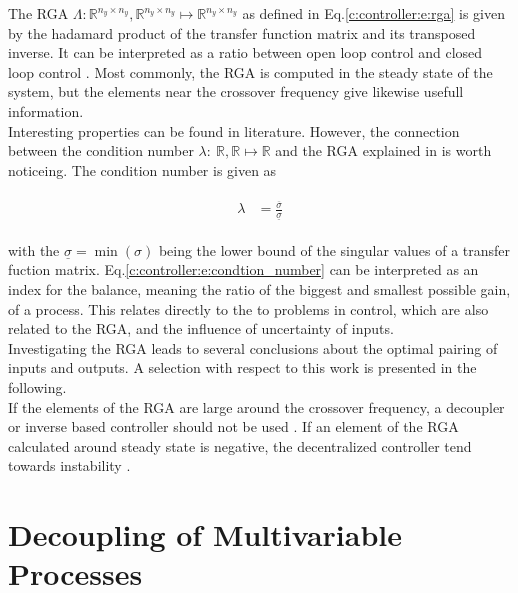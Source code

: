 The RGA $\Lambda:\mathbb{R}^{n_y \times n_y},\mathbb{R}^{n_y \times n_y} \mapsto \mathbb{R}^{n_y \times n_y}$ as defined in Eq.\ref{c:controller:e:rga} is given by the hadamard product of the transfer function matrix and its transposed inverse. It can be interpreted as a ratio between open loop control and closed loop control \cite[p.221]{Glad2000}. Most commonly, the RGA is computed in the steady state of the system, but the elements near the crossover frequency give likewise usefull information.\\

Interesting properties can be found in literature. However, the connection between the condition number $\lambda:~\mathbb{R},\mathbb{R} \mapsto \mathbb{R}$ and the RGA explained in \cite[p.88 f.]{Skogestad2005} is worth noticeing. The condition number is given as

\begin{align}
\begin{split}
\lambda &= \frac{\overline{\sigma}}{\underline{\sigma}}
\end{split}
\label{c:controller:e:condtion_number}
\end{align}

with the $\underline{\sigma} = \min(\sigma)$ being the lower bound of the singular values of a transfer fuction matrix. Eq.\ref{c:controller:e:condtion_number} can be interpreted as an index for the balance, meaning the ratio of the biggest and smallest possible gain, of a process. This relates directly to the to problems in control, which are also related to the RGA, and the influence of uncertainty of inputs.\\

Investigating the RGA leads to several conclusions about the optimal pairing of inputs and outputs. A selection with respect to this work is presented in the following.\\

If the elements of the RGA are large around the crossover frequency, a decoupler or inverse based controller should not be used \cite[p. 89]{Skogestad2005}. If an element of the RGA calculated around steady state is negative, the decentralized controller tend towards instability \cite[p.90, p.447]{Skogestad2005}.

\section{Decoupling of Multivariable Processes} %
\label{c:controller:s:decoupling}


